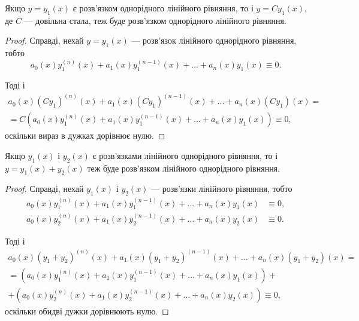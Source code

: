 \begin{theorem}
	Якщо $y = y_1(x)$ є розв'язком однорідного лінійного рівняння, то і $y = C y_1 (x)$, де $C$ --- довільна стала, теж буде розв'язком однорідного лінійного рівняння.
\end{theorem}

\begin{proof}
	Справді, нехай $y = y_1(x)$ --- розв'язок лінійного однорідного рівняння, тобто
	\begin{equation*}
		a_0(x) y_1^{(n)} (x) + a_1(x) y_1^{(n - 1)} (x) + \ldots + a_n(x) y_1(x) \equiv 0.
	\end{equation*}

	Тоді і
	\begin{multline*}
		a_0(x) (C y_1)^{(n)}(x) + a_1(x) (C y_1)^{(n - 1)}(x) + \ldots + a_n(x) (C y_1)(x) = \\
		= C \left( a_0(x) y_1^{(n)} (x) + a_1(x) y_1^{(n - 1)} (x) + \ldots + a_n(x) y_1(x) \right) \equiv 0,
	\end{multline*}
	оскільки вираз в дужках дорівнює нулю.
\end{proof}

\begin{theorem}
	Якщо $y_1(x)$ і $y_2(x)$ є розв'язками лінійного однорідного рівняння, то і $y = y_1(x) + y_2(x)$ теж буде розв'язком лінійного однорідного рівняння.
\end{theorem}

\begin{proof}
	Справді, нехай $y_1(x)$ і $y_2(x)$ --- розв'язки лінійного рівняння, тобто
	\begin{align*}
		a_0(x) y_1^{(n)} (x) + a_1(x) y_1^{(n - 1)} (x) + \ldots + a_n(x) y_1(x) &\equiv 0, \\
		a_0(x) y_2^{(n)} (x) + a_1(x) y_2^{(n - 1)} (x) + \ldots + a_n(x) y_2(x) &\equiv 0.
	\end{align*}

	Тоді і
	\begin{multline*}
		a_0(x) (y_1 + y_2)^{(n)} (x) + a_1(x) (y_1 + y_2)^{(n - 1)} (x) + \ldots + a_n(x) (y_1 + y_2) (x) = \\
		= \left( a_0(x) y_1^{(n)} (x) + a_1(x) y_1^{(n - 1)} (x) + \ldots + a_n(x) y_1(x) \right) + \\
		+ \left( a_0(x) y_2^{(n)} (x) + a_1(x) y_2^{(n - 1)} (x) + \ldots + a_n(x) y_2(x) \right) \equiv 0,
	\end{multline*}
	оскільки обидві дужки дорівнюють нулю.
\end{proof}

